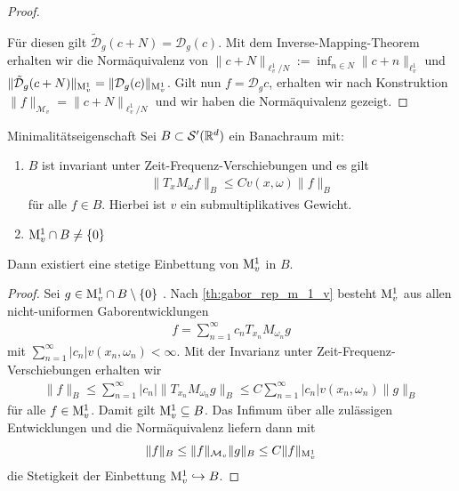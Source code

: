 \begin{proof}
\begin{center}
	\end{center}
	Für diesen gilt $ \tilde{\mathcal{D}}_g(c + N)  = \mathcal{D}_g(c) $.
	Mit dem Inverse-Mapping-Theorem erhalten wir die Normäquivalenz von 
	$ \| c + N \|_{\ell_v^1 / N} := \inf_{n \in N} \| c + n \|_{\ell^1_v}  $ 
	und $ \|\tilde{\mathcal{D}}_g(c + N)\|_{\mathrm{M}_v^1} = \| \mathcal{D}_g( c ) \|_{\mathrm{M}^1_v}   $.
	Gilt nun $ f = \mathcal{D}_g c  $, erhalten wir nach Konstruktion
	$ \| f \|_{\mathcal{M}_v } = \| c + N \|_{\ell_v^1 / N} $ und wir haben die Normäquivalenz gezeigt.
\end{proof}



\begin{genericthm}{Minimalitätseigenschaft}\label{th:minimality_feichtinger}
	Sei $ B \subset \mathcal{S}^\prime(\mathbb{R}^d) $ ein Banachraum mit:
	\begin{enumerate}[label =\textbf{(\roman*)}]
		\item 
		$ B $ ist invariant unter Zeit-Frequenz-Verschiebungen und es gilt
		\begin{align*}
		\| T_x M_\omega f\|_B \leq C  v(x, \omega) \| f \|_B
		\end{align*}
		für alle $ f \in B $.
		Hierbei ist $ v $ ein submultiplikatives Gewicht.
		\item
		$ \mathrm{M}_v^1 \cap B \neq \{ 0\} $
	\end{enumerate}
	Dann existiert eine stetige Einbettung von $ \mathrm{M}_v^1 $ in $ B $.
\end{genericthm}

\begin{proof}
	Sei $ g \in \mathrm{M}^1_v \cap B  \setminus \{ 0\}$ .
	Nach \ref{th:gabor_rep_m_1_v} besteht $ \mathrm{M}_v^1 $ aus allen nicht-uniformen Gaborentwicklungen 
	\begin{align*}
	f = \sum \limits_{n = 1}^\infty c_n T_{x_n} M_{\omega_n} g
	\end{align*}
	mit $ \sum_{n = 1}^\infty |c_n| v(x_n,\omega_n) < \infty$. Mit der Invarianz unter Zeit-Frequenz-Verschiebungen erhalten wir
	\begin{align*}
	\| f \|_B \leq
	\sum \limits_{n=1}^\infty |c_n| \| T_{x_n} M_{\omega_n} g \|_B
	\leq 
	C \sum \limits_{n=1}^\infty |c_n| v(x_n, \omega_n) \| g \|_B 
	\end{align*}
	für alle $ f \in \mathrm{M}_v^1 $. Damit gilt $ \mathrm{M}^1_v \subseteq B $.
	Das Infimum über alle zulässigen Entwicklungen und die Normäquivalenz liefern dann mit
	\begin{align*}
	\| f \|_B \leq \|f \|_{\mathcal{M}_v} \|g \|_B \leq C \| f \|_{\mathrm{M}_v^1}
	\end{align*}
	die Stetigkeit der Einbettung $ \mathrm{M}_v^1 \hookrightarrow B$.
\end{proof}




